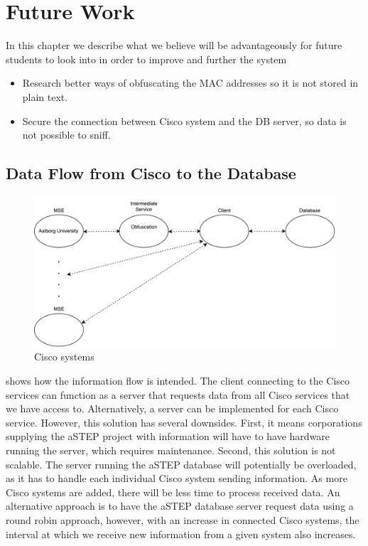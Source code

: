 \chapter{Future Work}
\label{Cha:Future_Work}
In this chapter we describe what we believe will be advantageously for future students to look into in order to improve and further the system 

\begin{itemize}
	\item Research better ways of obfuscating the MAC addresses so it is not stored in plain text.
	\item Secure the connection between Cisco system and the DB server, so data is not possible to sniff.
\end{itemize}


\section{Data Flow from Cisco to the Database}\label{sec:data_flow}
\begin{figure}[ht]
	\begin{center}
		\includegraphics[scale=0.7]{graphics/ciscoNew.pdf}
		\caption{Cisco systems}
		\label{fig:cisco_systems}
	\end{center} 
\end{figure}
 shows how the information flow is intended. The client connecting to the Cisco services can function as a server that requests data from all Cisco services that we have access to. Alternatively, a server can be implemented for each Cisco service. However, this solution has several downsides. First, it means corporations supplying the aSTEP project with information will have to have hardware running the server, which requires maintenance. Second, this solution is not scalable. The server running the aSTEP database will potentially be overloaded, as it has to handle each individual Cisco system sending information. As more Cisco systems are added, there will be less time to process received data. An alternative approach is to have the aSTEP database server request data using a round robin approach, however, with an increase in connected Cisco systems, the interval at which we receive new information from a given system also increases.

